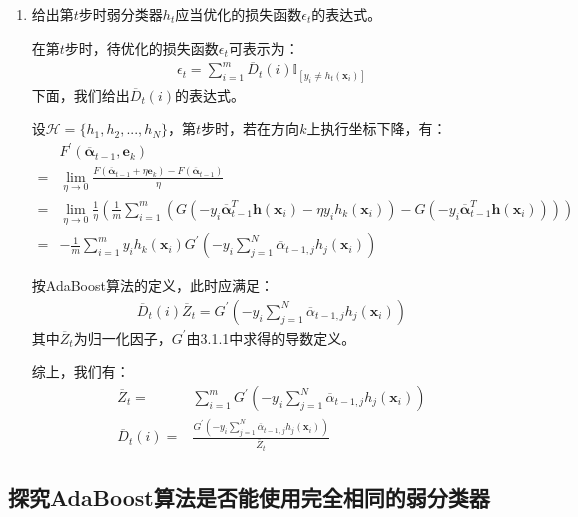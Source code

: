 \documentclass[12pt, a4paper]{article}
\newcommand{\vv}[1]{{\bm{#1}}}
\newcommand{\al}{{\overline{\alpha}}}
\newcommand{\HH}{{\mathcal{H}}}
\newcommand{\unit}{{\mathbb{I}}}
\begin{document}
\begin{enumerate}
            综上，我们证明了$G$是$\mathbb{R}$上处处可导的凸函数。

        \item 给出第$t$步时弱分类器$h_t$应当优化的损失函数$\epsilon_t$的表达式。

            在第$t$步时，待优化的损失函数$\epsilon_t$可表示为：
            \begin{align*}
            \epsilon_t = \sum_{i = 1}^{m} \overline{D}_t(i) \unit_{[y_i \ne h_t(\vv{x}_i)]}
            \end{align*}
            下面，我们给出$\overline{D}_t(i)$的表达式。

            设$\HH = \{h_1, h_2, ..., h_N\}$，第$t$步时，若在方向$k$上执行坐标下降，有：
            \begin{align*}
            &F^\prime(\vv{\al}_{t - 1}, \vv{e}_k) \\
            =& \lim_{\eta \rightarrow 0} \frac{F(\vv{\al}_{t - 1} + \eta \vv{e}_k) - F(\vv{\al}_{t - 1})}{\eta} \\
            =& \lim_{\eta \rightarrow 0} \frac{1}{\eta} (\frac{1}{m} \sum_{i = 1}^{m} (G(-y_i \vv{\al}_{t - 1}^T \vv{h}(\vv{x}_i) - \eta y_i h_k(\vv{x}_i)) - G(-y_i \vv{\al}_{t - 1}^T \vv{h}(\vv{x}_i)))) \\
            =& -\frac{1}{m} \sum_{i = 1}^{m} y_i h_k(\vv{x}_i) G^\prime(-y_i \sum_{j = 1}^{N} \al_{t - 1, j} h_j(\vv{x}_i))
            \end{align*}

            按AdaBoost算法的定义，此时应满足：
            \begin{align*}
            \overline{D}_t(i) \overline{Z}_t = G^\prime(-y_i \sum_{j = 1}^{N} \al_{t - 1, j} h_j(\vv{x}_i))
            \end{align*}
            其中$\overline{Z}_t$为归一化因子，$G^\prime$由3.1.1中求得的导数定义。

            综上，我们有：
            \begin{align*}
            \overline{Z}_t =& \sum_{i = 1}^{m} G^\prime(-y_i \sum_{j = 1}^{N} \al_{t - 1, j} h_j(\vv{x}_i)) \\
            \overline{D}_t(i) =& \frac{G^\prime(-y_i \sum_{j = 1}^{N} \al_{t - 1, j} h_j(\vv{x}_i))}{\overline{Z}_t}
            \end{align*}

        \end{enumerate}

    \subsection{探究AdaBoost算法是否能使用完全相同的弱分类器}
\end{document}
